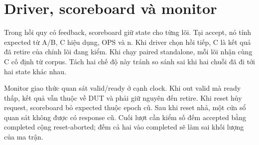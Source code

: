 \section{Driver, scoreboard và monitor}


Trong hồi quy có feedback, scoreboard giữ state cho từng
lõi. Tại accept, nó tính expected từ A/B, C hiệu dụng,
OPS và n. Khi driver chọn hồi tiếp, C là kết quả đã retire
của chính lõi đang kiểm. Khi chạy paired standalone, mỗi lõi
nhận cùng C cố định từ corpus. Tách hai chế độ này tránh
so sánh sai khi hai chuỗi đã đi tới hai state khác nhau.

Monitor giao thức quan sát valid/ready ở cạnh clock. Khi
out valid mà ready thấp, kết quả vẫn thuộc về DUT và phải
giữ nguyên đến retire. Khi reset hủy request, scoreboard
bỏ expected thuộc epoch cũ. Sau khi reset nhả, một cửa sổ
quan sát không được có response cũ. Cuối lượt cần kiểm số
đếm accepted bằng completed cộng reset-aborted; đếm cả hai
vào completed sẽ làm sai khối lượng của ma trận.



